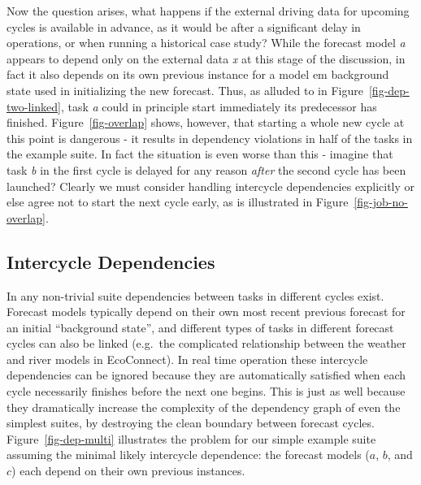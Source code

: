 \documentclass[11pt,a4paper]{article}
\begin{document}
Now the question arises, what happens if the external driving data for
upcoming cycles is available in advance, as it would be after a
significant delay in operations, or when running a historical case
study?  While the forecast model {\em a} appears to depend only on the
external data {\em x} at this stage of the discussion, in fact it also
depends on its own previous instance for a model {em background state}
used in initializing the new forecast. Thus, as alluded to in
Figure~\ref{fig-dep-two-linked}, task {\em a} could in principle start
immediately its predecessor has finished.  Figure~\ref{fig-overlap}
shows, however, that starting a whole new cycle at this point is
dangerous - it results in dependency violations in half of the tasks in
the example suite. In fact the situation is even worse than this
- imagine that task {\em b} in the first cycle is delayed for any reason
{\em after} the second cycle has been launched? Clearly we must consider
handling intercycle dependencies explicitly or else agree not to start
the next cycle early, as is illustrated in Figure~\ref{fig-job-no-overlap}.

\subsection{Intercycle Dependencies} 
\label{IntercycleDependencies}

In any non-trivial suite dependencies between tasks in different cycles
exist. Forecast models typically depend on their own most recent
previous forecast for an initial ``background state'', and different
types of tasks in different forecast cycles can also be linked (e.g.\
the complicated relationship between the weather and river models in
EcoConnect). In real time operation these intercycle dependencies
can be ignored because they are automatically satisfied when each cycle
necessarily finishes before the next one begins. This is just as well
because they dramatically increase the complexity of the dependency
graph of even the simplest suites, by destroying the clean boundary
between forecast cycles. Figure~\ref{fig-dep-multi} illustrates the
problem for our simple example suite assuming the minimal likely
intercycle dependence: the forecast models ($a$, $b$, and $c$) each
depend on their own previous instances.
\end{document}
